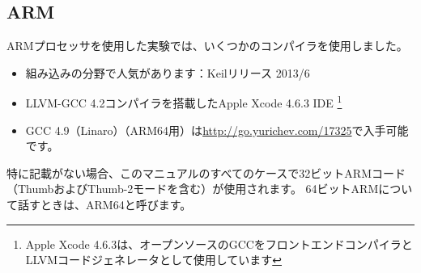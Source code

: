 \subsection{ARM}
\label{sec:hw_ARM}

\myindex{\idevices}
ARMプロセッサを使用した実験では、いくつかのコンパイラを使用しました。

\begin{itemize}
\item 組み込みの分野で人気があります：Keilリリース 2013/6

\item LLVM-GCC 4.2コンパイラを搭載したApple Xcode 4.6.3 IDE
\footnote{Apple Xcode 4.6.3は、オープンソースのGCCをフロントエンドコンパイラとLLVMコードジェネレータとして使用しています}

\item GCC 4.9（Linaro）（ARM64用）は\url{http://go.yurichev.com/17325}で入手可能です。

\end{itemize}

特に記載がない場合、このマニュアルのすべてのケースで32ビットARMコード（ThumbおよびThumb-2モードを含む）が使用されます。 
64ビットARMについて話すときは、ARM64と呼びます。







